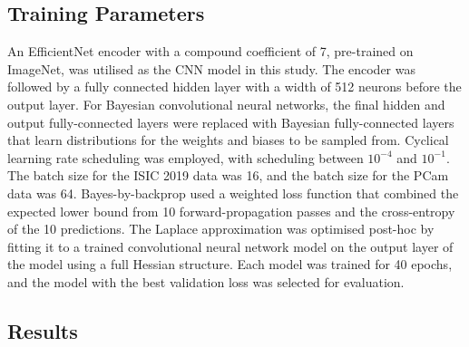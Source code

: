\subsection{Training Parameters}
An EfficientNet encoder with a compound coefficient of 7, pre-trained on ImageNet, was utilised as the CNN model in this study. The encoder was followed by a fully connected hidden layer with a width of 512 neurons before the output layer. For Bayesian convolutional neural networks, the final hidden and output fully-connected layers were replaced with Bayesian fully-connected layers that learn distributions for the weights and biases to be sampled from. Cyclical learning rate scheduling was employed, with scheduling between $10^{-4}$ and $10^{-1}$. The batch size for the ISIC 2019 data was 16, and the batch size for the PCam data was 64. Bayes-by-backprop used a weighted loss function that combined the expected lower bound from 10 forward-propagation passes and the cross-entropy of the 10 predictions. The Laplace approximation was optimised post-hoc by fitting it to a trained convolutional neural network model on the output layer of the model using a full Hessian structure. Each model was trained for 40 epochs, and the model with the best validation loss was selected for evaluation.

\subsection{Results}
\label{subsec:calibration_results}

